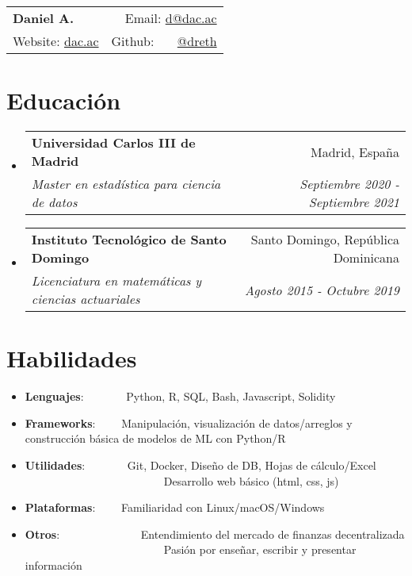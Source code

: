 \documentclass[a4paper,20pt]{article}
\makeatletter
\newcommand{\resumeItem}[2]{
  \item\small{
    \textbf{#1}{: #2 \vspace{-2pt}}
  }
}
\newcommand{\resumeSubheading}[4]{
  \vspace{-1pt}\item
    \begin{tabular*}{0.97\textwidth}{l@{\extracolsep{\fill}}r}
      \textbf{#1} & #2 \\
      \textit{#3} & \textit{#4} \\
    \end{tabular*}\vspace{-5pt}
}
\newcommand{\resumeSubItem}[2]{\resumeItem{#1}{#2}\vspace{-3pt}}
\newcommand{\resumeSubHeadingListStart}{\begin{itemize}[leftmargin=*]}
\newcommand{\resumeSubHeadingListEnd}{\end{itemize}}
\makeatother
\begin{document}
\begin{tabular*}{\textwidth}{l@{\extracolsep{\fill}}r}
  \textbf{{\LARGE Daniel A.}} & Email: {\color{blue}\href{mailto:}{d@dac.ac}}\\
  Website: {\color{blue}\href{https://dac.ac}{dac.ac}} & Github: ~~~{\color{blue}\href{https://github.com/dreth}{@dreth}}
\end{tabular*}




            
\vspace{-4pt}
\section{Educación}
\resumeSubHeadingListStart
        
  \resumeSubheading
    {Universidad Carlos III de Madrid}{Madrid, España}
    {Master en estadística para ciencia de datos}{Septiembre 2020 - Septiembre 2021}
\vspace{-2pt}
  \resumeSubheading
    {Instituto Tecnológico de Santo Domingo}{Santo Domingo, República Dominicana}
    {Licenciatura en matemáticas y ciencias actuariales}{Agosto 2015 - Octubre 2019}
\resumeSubHeadingListEnd


            
\vspace{-7pt}
\section{Habilidades}
  \resumeSubHeadingListStart
            
        
\vspace{-2pt}
\resumeSubItem{Lenguajes}{~~~~~~~Python, R, SQL, Bash, Javascript, Solidity}
\vspace{-2pt}
\resumeSubItem{Frameworks}{~~~~Manipulación, visualización de datos/arreglos y construcción básica de modelos de ML con Python/R}
\vspace{-2pt}
\resumeSubItem{Utilidades}{~~~~~~~Git, Docker, Diseño de DB, Hojas de cálculo/Excel\\~~~~~~~~~~~~~~~~~~~~~~~~~Desarrollo web básico (html, css, js)}
\vspace{-2pt}
\resumeSubItem{Plataformas}{~~~~Familiaridad con Linux/macOS/Windows}
\vspace{-2pt}
\resumeSubItem{Otros}{~~~~~~~~~~~~~~Entendimiento del mercado de finanzas decentralizada\\~~~~~~~~~~~~~~~~~~~~~~~~~Pasión por enseñar, escribir y presentar información}
\resumeSubHeadingListEnd
\end{document}
